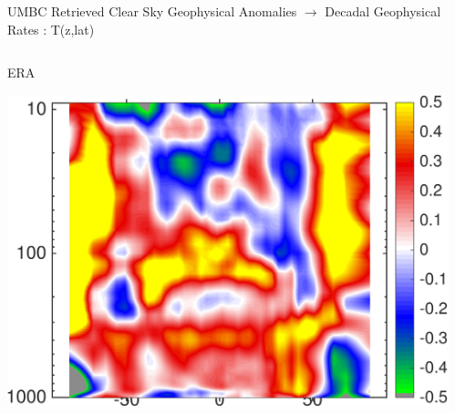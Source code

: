 \documentclass[10pt,t]{beamer}
\begin{document}

\begin{frame}{UMBC Retrieved Clear Sky Geophysical Anomalies $\rightarrow$ Decadal Geophysical Rates : T(z,lat)}
\vspace{-0.35in}

\begin{columns}
\begin{column}{0.45\columnwidth}
\begin{block}{\footnotesize ERA}
\vspace{-0.1in}
\begin{center}
\includegraphics[width=\linewidth]{Figs/ClearAnom/rawERAtzrates.png}
\end{center}
\end{block}
\end{column}

\begin{column}{0.45\columnwidth}
\end{column}
\end{columns}

\vspace{-0.25in}


\end{frame}
\end{document}
